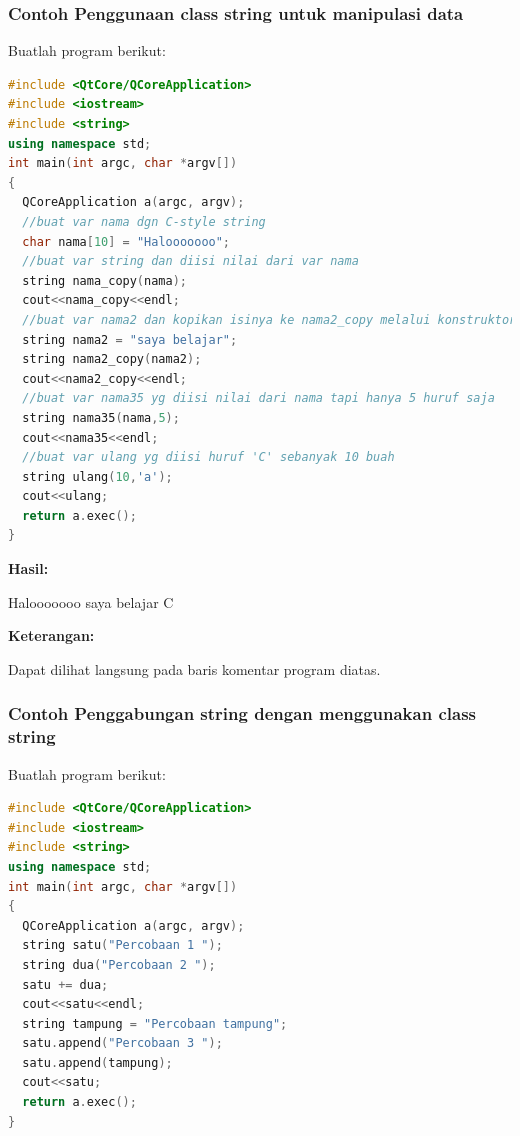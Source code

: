 \subsubsection*{Contoh  Penggunaan class string untuk manipulasi data}

Buatlah program berikut:

\begin{lstlisting}[language=c++, caption=Penggunaan class string untuk manipulasi data, label=contoh3-25]
#include <QtCore/QCoreApplication>
#include <iostream>
#include <string>
using namespace std;
int main(int argc, char *argv[])
{
  QCoreApplication a(argc, argv);
  //buat var nama dgn C-style string
  char nama[10] = "Halooooooo";
  //buat var string dan diisi nilai dari var nama
  string nama_copy(nama);
  cout<<nama_copy<<endl;
  //buat var nama2 dan kopikan isinya ke nama2_copy melalui konstruktor
  string nama2 = "saya belajar";
  string nama2_copy(nama2);
  cout<<nama2_copy<<endl;
  //buat var nama35 yg diisi nilai dari nama tapi hanya 5 huruf saja
  string nama35(nama,5);
  cout<<nama35<<endl;
  //buat var ulang yg diisi huruf 'C' sebanyak 10 buah
  string ulang(10,'a');
  cout<<ulang;
  return a.exec();
}
\end{lstlisting}

\textbf{Hasil:}

 \begin{lcverbatim}
 Halooooooo
 saya belajar
 C
 \end{lcverbatim}

\textbf{Keterangan:}

Dapat dilihat langsung pada baris komentar program diatas.

\subsubsection*{Contoh  Penggabungan string dengan menggunakan class string}

Buatlah program berikut:

\begin{lstlisting}[language=c++, caption=Penggabungan string dengan menggunakan class string, label=contoh3-26]
#include <QtCore/QCoreApplication>
#include <iostream>
#include <string>
using namespace std;
int main(int argc, char *argv[])
{
  QCoreApplication a(argc, argv);
  string satu("Percobaan 1 ");
  string dua("Percobaan 2 ");
  satu += dua;
  cout<<satu<<endl;
  string tampung = "Percobaan tampung";
  satu.append("Percobaan 3 ");
  satu.append(tampung);
  cout<<satu;
  return a.exec();
}
\end{lstlisting}

